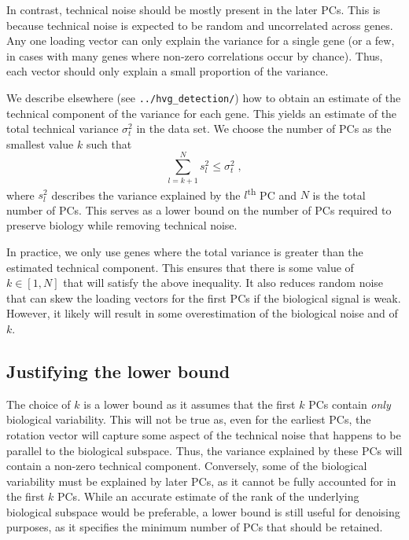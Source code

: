 \documentclass{article}
\begin{document}
In contrast, technical noise should be mostly present in the later PCs.
This is because technical noise is expected to be random and uncorrelated across genes.
Any one loading vector can only explain the variance for a single gene (or a few, in cases with many genes where non-zero correlations occur by chance).
Thus, each vector should only explain a small proportion of the variance.

We describe elsewhere (see \verb!../hvg_detection/!) how to obtain an estimate of the technical component of the variance for each gene.
This yields an estimate of the total technical variance $\sigma^2_t$ in the data set.
We choose the number of PCs as the smallest value $k$ such that 
\[
    \sum_{l=k+1}^N s^2_l  \le \sigma^2_t \;,
\]
where $s^2_l$ describes the variance explained by the $l$\textsuperscript{th} PC and $N$ is the total number of PCs.
This serves as a lower bound on the number of PCs required to preserve biology while removing technical noise.


In practice, we only use genes where the total variance is greater than the estimated technical component.
This ensures that there is some value of $k \in [1, N]$ that will satisfy the above inequality.
It also reduces random noise that can skew the loading vectors for the first PCs if the biological signal is weak.
However, it likely will result in some overestimation of the biological noise and of $k$.

\subsection{Justifying the lower bound} 
The choice of $k$ is a lower bound as it assumes that the first $k$ PCs contain \textit{only} biological variability.
This will not be true as, even for the earliest PCs, the rotation vector will capture some aspect of the technical noise that happens to be parallel to the biological subspace.
Thus, the variance explained by these PCs will contain a non-zero technical component.
Conversely, some of the biological variability must be explained by later PCs, as it cannot be fully accounted for in the first $k$ PCs.
While an accurate estimate of the rank of the underlying biological subspace would be preferable, a lower bound is still useful for denoising purposes,
as it specifies the minimum number of PCs that should be retained.
\end{document}

